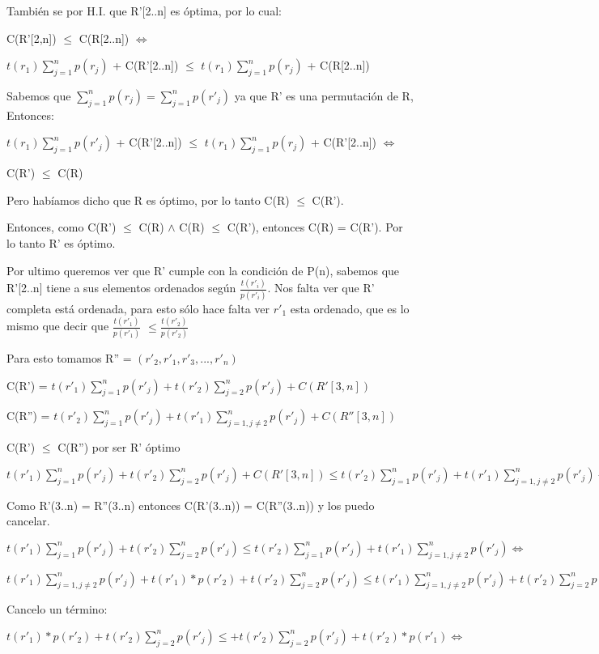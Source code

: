 También se por H.I. que R'[2..n] es óptima, por lo cual: 

C(R'[2,n]) $\leq$ C(R[2..n]) $\iff$

$t(r_1) \sum_{j=1}^{n}p(r_j)$ + C(R'[2..n]) $\leq$  $t(r_1) \sum_{j=1}^{n}p(r_j)$ + C(R[2..n])

Sabemos que $\sum_{j=1}^{n}p(r_j) = \sum_{j=1}^{n}p(r'_j)$ ya que R' es una permutación de R, Entonces:

$t(r_1) \sum_{j=1}^{n}p(r'_j)$ + C(R'[2..n]) $\leq$  $t(r_1) \sum_{j=1}^{n}p(r_j)$ + C(R'[2..n]) $\iff$

C(R') $\leq$ C(R)

Pero habíamos dicho que R es óptimo, por lo tanto C(R) $\leq$ C(R').

Entonces, como C(R') $\leq$ C(R) $\wedge$ C(R) $\leq$ C(R'), entonces C(R) = C(R'). Por lo tanto R' es óptimo.

Por ultimo queremos ver que R' cumple con la condición de P(n), sabemos que R'[2..n] tiene a sus elementos ordenados según $\frac{t(r'_i)}{p(r'_i)}$. Nos falta ver que R' completa está ordenada, para esto sólo hace falta ver $r'_1$ esta ordenado, que es lo mismo que decir que $\frac{t(r'_1)}{p(r'_1)}$ $\leq \frac{t(r'_2)}{p(r'_2)}$

Para esto tomamos R'' = $(r'_2,r'_1,r'_3,...,r'_n)$

C(R') = $t(r'_1) \sum_{j=1}^{n}p(r'_j) + t(r'_2) \sum_{j=2}^{n}p(r'_j) + C(R'[3,n]) $

C(R'') = $t(r'_2) \sum_{j=1}^{n}p(r'_j) + t(r'_1) \sum_{j=1,j\neq 2}^{n}p(r'_j) + C(R''[3,n]) $

C(R') $\leq$ C(R'') por ser R' óptimo

$t(r'_1) \sum_{j=1}^{n}p(r'_j) + t(r'_2) \sum_{j=2}^{n}p(r'_j) + C(R'[3,n]) \leq t(r'_2) \sum_{j=1}^{n}p(r'_j) + t(r'_1) \sum_{j=1,j\neq 2}^{n}p(r'_j) + C(R''[3,n]) \iff$

Como R'(3..n) = R''(3..n) entonces C(R'(3..n)) = C(R''(3..n)) y los puedo cancelar.

$t(r'_1) \sum_{j=1}^{n}p(r'_j) + t(r'_2) \sum_{j=2}^{n}p(r'_j)  \leq t(r'_2) \sum_{j=1}^{n}p(r'_j) + t(r'_1) \sum_{j=1,j\neq 2}^{n}p(r'_j)  \iff$

$t(r'_1) \sum_{j=1,j\neq 2}^{n}p(r'_j) + t(r'_1) * p(r'_2) + t(r'_2) \sum_{j=2}^{n}p(r'_j) \leq t(r'_1) \sum_{j=1,j\neq 2}^{n}p(r'_j) + t(r'_2) \sum_{j=2}^{n}p(r'_j)+ t(r'_2) * p(r'_1) \iff$  

Cancelo un término:

$t(r'_1) * p(r'_2) + t(r'_2) \sum_{j=2}^{n}p(r'_j) \leq + t(r'_2) \sum_{j=2}^{n}p(r'_j)+ t(r'_2) * p(r'_1) \iff$

